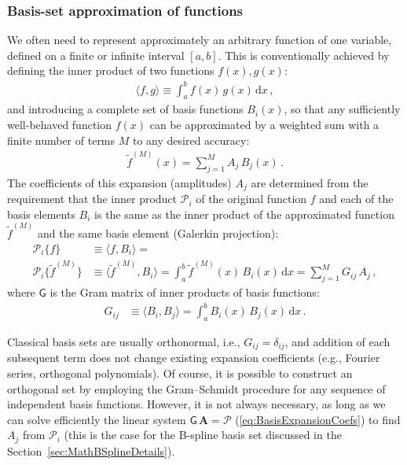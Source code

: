 \documentclass[12pt]{article}
\renewcommand{\d}{\mathrm{d}}
\begin{document}
\subsubsection{Basis-set approximation of functions}  \label{sec:MathBasisSetDetails}

We often need to represent approximately an arbitrary function of one variable, defined on a finite or infinite interval $[a,b]$.
This is conventionally achieved by defining the inner product of two functions $f(x), g(x)$:
\begin{align}  \label{eq:InnerProduct}
\langle f, g \rangle \equiv \int_a^b f(x)\, g(x)\, \d x \,,
\end{align}
and introducing a complete set of basis functions $B_i(x)$, so that any sufficiently well-behaved function $f(x)$ can be approximated by a weighted sum with a finite number of terms $M$ to any desired accuracy:
\begin{align}  \label{eq:BasisApproximation}
\tilde f^{(M)}(x) = \sum_{j=1}^M A_j\,B_j(x) \,.
\end{align}
The coefficients of this expansion (amplitudes) $A_j$ are determined from the requirement that the inner product $\mathcal P_i$ of the original function $f$ and each of the basis elements $B_i$ is the same as the inner product of the approximated function $\tilde f^{(M)}$ and the same basis element (Galerkin projection):
\begin{subequations}  \label{eq:BasisExpansionCoefs}
\begin{align}
\mathcal P_i \{f\} &\equiv \langle f, B_i \rangle = \\
\mathcal P_i \{\tilde f^{(M)}\} &\equiv \langle \tilde f^{(M)}, B_i \rangle =
\int_a^b \tilde f^{(M)}(x)\, B_i(x)\, \d x = \sum_{j=1}^M G_{ij}\, A_j  \,,
\end{align}
\end{subequations}
where $\mathsf G$ is the Gram matrix of inner products of basis functions:
\begin{align}  \label{eq:BasisExpansionMatrix}
G_{ij} &\equiv \langle B_i, B_j \rangle  =  \int_a^b B_i(x)\,B_j(x)\,\d x \,.
\end{align}

Classical basis sets are usually orthonormal, i.e., $G_{ij} = \delta_{ij}$, and addition of each subsequent term does not change existing expansion coefficients (e.g., Fourier series, orthogonal polynomials). Of course, it is possible to construct an orthogonal set by employing the Gram--Schmidt procedure for any sequence of independent basis functions. However, it is not always necessary, as long as we can solve efficiently the linear system $\mathsf G\,\boldsymbol A = \boldsymbol{\mathcal P}$ (\ref{eq:BasisExpansionCoefs}) to find $A_j$ from $\mathcal P_i$ (this is the case for the B-spline basis set discussed in the Section~\ref{sec:MathBSplineDetails}).
\end{document}

